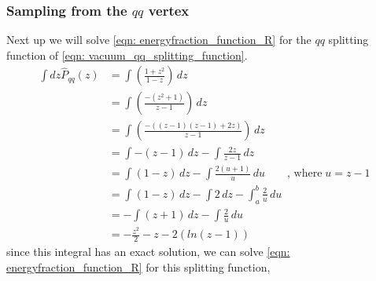 \documentclass[main.tex]{subfiles}
\begin{document}
\subsubsection*{Sampling from the \(qq\) vertex}
Next up we will solve \autoref{eqn: energyfraction_function_R} for the \(qq\) splitting function of \autoref{eqn: vacuum_qq_splitting_function}.
\begin{align}
    \int dz\hat{P}_{qq}(z) &= \int \left(\frac{1+z^2}{1-z} \right)\, dz \nonumber \\
    &= \int \left(\frac{-(z^2+1)}{z-1} \right)\, dz \nonumber \\
    &= \int \left(\frac{-((z-1)(z-1)+2z)}{z-1} \right)\, dz \nonumber \\
    &= \int -(z-1)\, dz - \int \frac{2z}{z-1} \, dz \nonumber \\
    &= \int (1-z) \, dz - \int \frac{2(u+1)}{u} \, du \qquad \text{, where}\; u=z-1 \nonumber \\
    &= \int (1-z) \, dz - \int 2\, dz - \int_a^b \frac{2}{u} \, du \nonumber  \\
    &= -\int (z+1) \, dz - \int \frac{2}{u} \, du \nonumber  \\
    &= -\frac{z^2}{2} - z - 2\left( ln(z-1)\right) 
\end{align}
since this integral has an exact solution, we can solve \autoref{eqn: energyfraction_function_R} for this splitting function,
\end{document}
